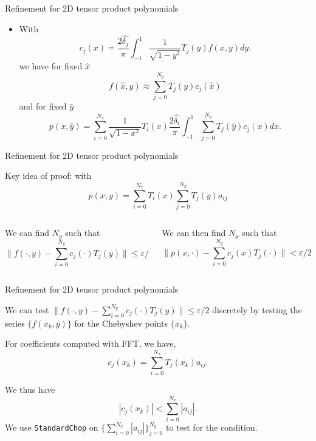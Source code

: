 \documentclass{beamer}
\begin{document}
\begin{frame}{Refinement for 2D tensor product polynomials}
\begin{itemize}
\item With $$
 	c_j(x) = \frac{2 \hat{\delta_j}}{\pi} \int_{-1}^{1} \frac{1}{\sqrt{1-y^2}}T_j(y)f(x,y)dy.
$$ we have for fixed $\hat{x}$
$$
f(\hat{x},y) \approx \sum_{j=0}^{N_y}T_j(y)c_j(\hat{x})
$$
and for fixed $\hat{y}$
$$
p(x,\hat{y}) = \sum_{i=0}^{N_x} \frac{1}{\sqrt{1-x^2}}T_i(x) \frac{2 \hat{\delta_i}}{\pi} \int_{-1}^{1}   \sum_{j=0}^{N_y}T_j(\hat{y})c_j(x) dx.
$$

\end{itemize}
\end{frame}


\begin{frame}[t]{Refinement for 2D tensor product polynomials}

\begin{center}
Key idea of proof: with $$p(x,y)=\sum_{i=0}^{N_x} T_i(x) \sum_{j=0}^{N_y} T_j(y)a_{ij}$$
\end{center}

\begin{columns}[t]
\begin{column}[t]{0.5\textwidth}
We can find $N_y$ such that
$$\|f(\cdot,y) -\sum_{i=0}^{N_y} c_j(\cdot)T_j(y) \| \leq \varepsilon/2$$
\end{column}
\begin{column}[t]{0.5\textwidth}
\begin{center}
We can then find $N_x$ such that
$$\|p(x,\cdot) - \sum_{i=0}^{N_y} c_j(x)T_j(\cdot)\|<\varepsilon/2,$$
\end{center}	
\end{column}

\end{columns}

\end{frame}


\begin{frame}{Refinement for 2D tensor product polynomials}
\begin{center}
We can test $\|f(\cdot,y) -\sum_{i=0}^{N_y} c_j(\cdot)T_j(y) \| \leq \varepsilon/2$ discretely by testing the series  $\{f(x_k,y)\}$ for the Chebyshev points $\{x_k\}$.
\end{center}

\begin{center}
For coefficients computed with FFT, we have,
$$ c_j(x_k) = \sum_{i=0}^{N_x}T_j(x_k)a_{ij}. $$
\end{center}

\begin{center}
We thus have
$$ |c_j(x_k)| < \sum_{i=0}^{N_x} |a_{ij}|. $$ We use {\tt StandardChop} on $\{ \sum_{i=0}^{N_x} |a_{ij}|  \}_{j=0}^{N_y}$ to test for the condition.
\end{center}

\end{frame}
\end{document}
